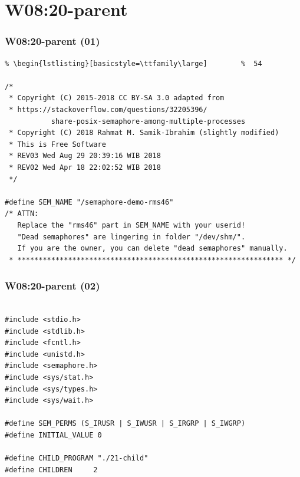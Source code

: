 \documentclass[aspectratio=169, xcolor=table, notheorems, hyperref={pdfpagelabels=false}]{beamer}
\begin{document}
\section{W08:20-parent}
\begin{frame}[fragile]
\frametitle{W08:20-parent (01)}
\begin{lstlisting}[basicstyle=\ttfamily\footnotesize] %  72
% \begin{lstlisting}[basicstyle=\ttfamily\small]        %  65
% \begin{lstlisting}[basicstyle=\ttfamily\large]        %  54

/*
 * Copyright (C) 2015-2018 CC BY-SA 3.0 adapted from 
 * https://stackoverflow.com/questions/32205396/
           share-posix-semaphore-among-multiple-processes
 * Copyright (C) 2018 Rahmat M. Samik-Ibrahim (slightly modified)
 * This is Free Software
 * REV03 Wed Aug 29 20:39:16 WIB 2018
 * REV02 Wed Apr 18 22:02:52 WIB 2018
 */

#define SEM_NAME "/semaphore-demo-rms46"
/* ATTN:
   Replace the "rms46" part in SEM_NAME with your userid!
   "Dead semaphores" are lingering in folder "/dev/shm/".
   If you are the owner, you can delete "dead semaphores" manually.
 * *************************************************************** */

\end{lstlisting}
\end{frame}

\begin{frame}[fragile]
\frametitle{W08:20-parent (02)}
\begin{lstlisting}[basicstyle=\ttfamily\small]        %  65
% \begin{lstlisting}[basicstyle=\ttfamily\large]        %  54

#include <stdio.h>
#include <stdlib.h>
#include <fcntl.h>
#include <unistd.h>
#include <semaphore.h>
#include <sys/stat.h>
#include <sys/types.h>
#include <sys/wait.h>

#define SEM_PERMS (S_IRUSR | S_IWUSR | S_IRGRP | S_IWGRP)
#define INITIAL_VALUE 0

#define CHILD_PROGRAM "./21-child"
#define CHILDREN     2

\end{lstlisting}
\end{frame}
\end{document}
